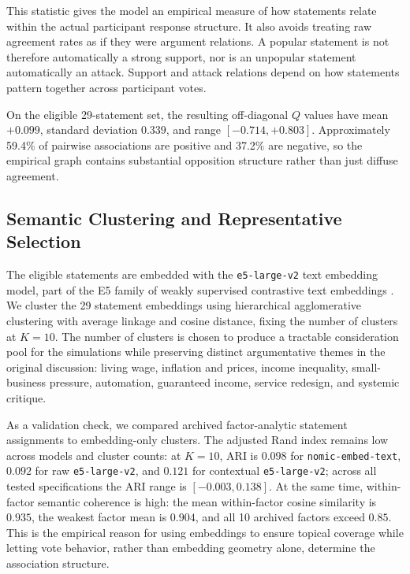This statistic gives the model an empirical measure of how statements relate
within the actual participant response structure. It also avoids treating raw
agreement rates as if they were argument relations. A popular statement is not
therefore automatically a strong support, nor is an unpopular statement
automatically an attack. Support and attack relations depend on how statements
pattern together across participant votes.

On the eligible 29-statement set, the resulting off-diagonal $Q$ values have
mean $+0.099$, standard deviation $0.339$, and range $[-0.714, +0.803]$.
Approximately 59.4\% of pairwise associations are positive and 37.2\% are
negative, so the empirical graph contains substantial opposition structure
rather than just diffuse agreement.

\subsection{Semantic Clustering and Representative Selection}

The eligible statements are embedded with the \texttt{e5-large-v2} text
embedding model, part of the E5 family of weakly supervised contrastive text
embeddings \citep{wang2022e5}. We cluster the 29 statement embeddings using
hierarchical agglomerative clustering with average linkage and cosine distance,
fixing the number of clusters at $K=10$. The number of clusters is chosen to
produce a tractable consideration pool for the simulations while preserving
distinct argumentative themes in the original discussion: living wage, inflation
and prices, income inequality, small-business pressure, automation, guaranteed
income, service redesign, and systemic critique.

As a validation check, we compared archived factor-analytic statement
assignments to embedding-only clusters. The adjusted Rand index remains low
across models and cluster counts: at $K=10$, ARI is $0.098$ for
\texttt{nomic-embed-text}, $0.092$ for raw \texttt{e5-large-v2}, and $0.121$
for contextual \texttt{e5-large-v2}; across all tested specifications the ARI
range is $[-0.003, 0.138]$. At the same time, within-factor semantic coherence
is high: the mean within-factor cosine similarity is $0.935$, the weakest
factor mean is $0.904$, and all 10 archived factors exceed $0.85$. This is the
empirical reason for using embeddings to ensure topical coverage while letting
vote behavior, rather than embedding geometry alone, determine the association
structure.

